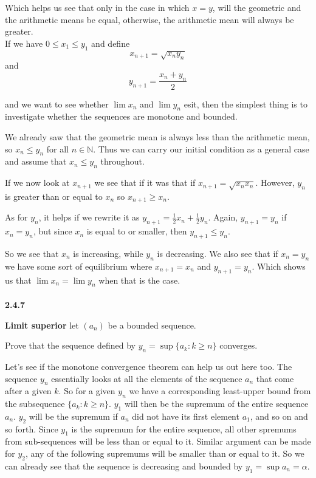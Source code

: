 Which helps us see that only in the case in which $x=y$, will the geometric and the arithmetic
means be equal, otherwise, the arithmetic mean will always be greater.
\\

If we have $0 \leq x_1 \leq y_1$ and define
$$
x_{n+1} = \sqrt{x_n y_n}
$$
and
$$
y_{n+1} = \frac{x_n + y_n}{2}
$$

and we want to see whether $\lim x_n$ and $\lim y_n$ esit, then the simplest thing is to investigate
whether the sequences are monotone and bounded.

We already saw that the geometric mean is always less than the arithmetic mean, so $x_n \leq y_n$
for all $n\in\mathbb{N}$.
Thus we can carry our initial condition as a general case and assume that $x_n \leq y_n$ throughout.

If we now look at $x_{n+1}$ we see that if it was that if $x_{n+1} = \sqrt{x_n x_n}$.
However, $y_n$ is greater than or equal to $x_n$ so $x_{n+1} \geq x_n$.

As for $y_n$, it helps if we rewrite it as $y_{n+1} = \frac{1}{2}x_n + \frac{1}{2}y_n$.
Again, $y_{n+1} = y_n$ if $x_n = y_n$, but since $x_n$ is equal to or smaller, then $y_{n+1} \leq y_{n}$.

So we see that $x_n$ is increasing, while $y_n$ is decreasing.
We also see that if $x_n = y_n$ we have some sort of equilibrium where $x_{n+1} = x_n$ and
$y_{n+1} = y_n$.
Which shows us that $\lim x_n = \lim y_n$ when that is the case.
\\~\\



\textbf{2.4.7}

\textbf{Limit superior} let $(a_n)$ be a bounded sequence.

Prove that the sequence defined by $y_n = \sup\{a_k : k\geq n\}$ converges.

Let's see if the monotone convergence theorem can help us out here too.
The sequence $y_n$ essentially looks at all the elements of the sequence $a_n$ that come after
a given $k$.
So for a given $y_n$ we have a corresponding least-upper bound from the subsequence $\{a_k : k\geq n\}$.
$y_1$ will then be the supremum of the entire sequence $a_n$.
$y_2$ will be the supremum if $a_n$ did not have its first element $a_1$, and so on and so forth.
Since $y_1$ is the supremum for the entire sequence, all other spremums from sub-sequences will be less
than or equal to it.
Similar argument can be made for $y_2$, any of the following supremums will be smaller than or equal to it.
So we can already see that the sequence is decreasing and bounded by $y_1 = \sup a_n = \alpha$.
\\

